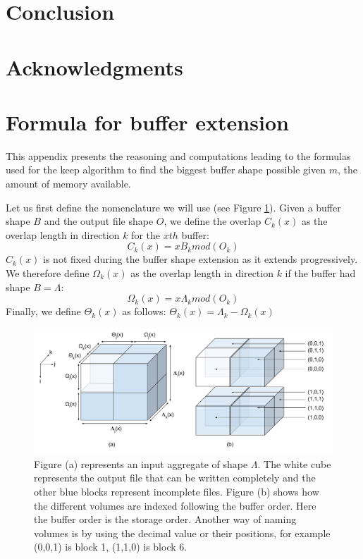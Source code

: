 \documentclass[conference]{IEEEtran}
\begin{document}
\section*{Conclusion}

\section*{Acknowledgments}




\appendices

  \section{Formula for buffer extension}
  \label{FormulasKeep}

  This appendix presents the reasoning and computations leading to the formulas used for the keep algorithm to find the biggest buffer shape possible given $m$, the amount of memory available.

  Let us first define the nomenclature we will use (see Figure \ref{fig:nomenclature_overlaps}).
  Given a buffer shape $B$ and the output file shape $O$, we define the overlap $C_k(x)$ as the overlap length in direction $k$ for the $x{th}$ buffer:
  $$C_k(x) = xB_k mod(O_k)$$
  $C_k(x)$ is not fixed during the buffer shape extension as it extends progressively.
  We therefore define $\Omega_k(x)$ as the overlap length in direction $k$ if the buffer had shape $B=\Lambda$:
  $$\Omega_k(x) = x\Lambda_k mod(O_k)$$
  Finally, we define $\Theta_k(x)$ as follows:
  $\Theta_k(x) = \Lambda_k - \Omega_k(x)$

  \begin{figure}[h]
  \centering
  \includegraphics[scale=0.45]{./figures/new/nomenclature_overlaps.png}
  \caption{Figure (a) represents an input aggregate of shape $\Lambda$. The white cube represents the output file that can be written completely and the other blue blocks represent incomplete files. Figure (b) shows how the different volumes are indexed following the buffer order. Here the buffer order is the storage order. Another way of naming volumes is by using the decimal value or their positions, for example (0,0,1) is block 1, (1,1,0) is block 6.
  }
  \label{fig:nomenclature_overlaps}
  \end{figure}
\end{document}
